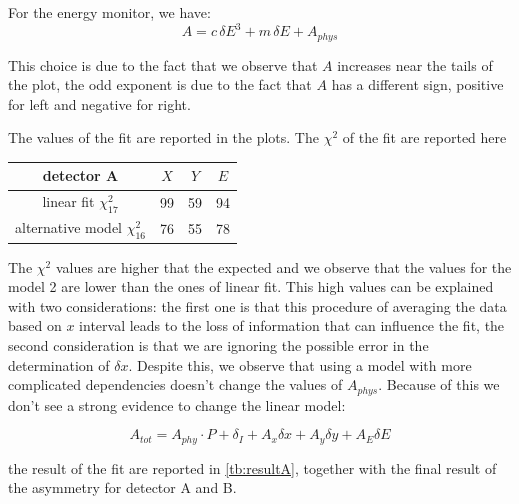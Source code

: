 For the energy monitor, we have:
\begin{equation}
A = c \, \delta E^{3} + m \, \delta E + A_{phys}
\end{equation}

This choice is due to the fact that we observe that $A$ increases near the tails of the plot, the odd exponent is due to the fact that $A$ has a different sign, positive for left and negative for right.

The values of the fit are reported in the plots. The $\chi^{2}$ of the fit are reported here

\begin{center}
\begin{tabular}{c|c|c|c}
\hline 
detector A & $X$ & $Y$ & $E$ \\
\hline 
linear fit $\chi^{2}_{17}$ & 99 & 59 & 94 \\ 
alternative model $\chi^{2}_{16}$ & 76 & 55 & 78 \\ 
\hline 
\end{tabular} 
\end{center}

The $\chi^{2}$ values are higher that the expected and we observe that the values for the model 2 are lower than the ones of linear fit.
This high values can be explained with two considerations: the first one is that this procedure of averaging the data based on $x$ interval leads to the loss of information that can influence the fit, the second consideration is that we are ignoring the possible error in the determination of $\delta x$.
Despite this, we observe that using a model with more complicated dependencies doesn't change  the values of $A_{phys}$. Because of this we don't see a strong evidence to change the linear model: 

\begin{equation}
A_{tot} = A_{phy} \cdot P + \delta_{I} + A_{x} \delta x + A_{y} \delta y + A_{E} \delta E 
\end{equation}


the result of the fit are reported in \ref{tb:resultA}, together with the final result of the asymmetry for detector A and B.

